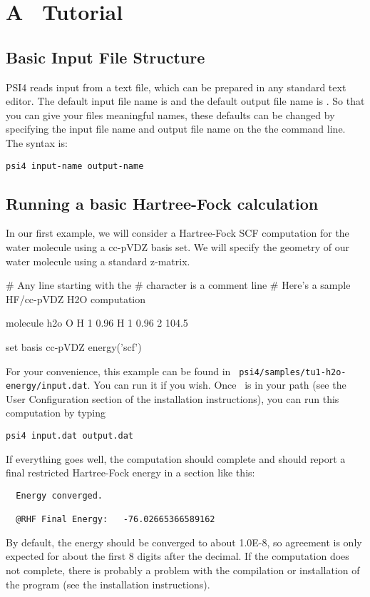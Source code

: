 \section{A \PSIfour\ Tutorial} \label{tutorial}

\subsection{Basic Input File Structure} 

PSI4 reads input from a text file, which can be prepared in any standard
text editor.  The default input file name is  and the
default output file name is .  So that you can give your
files meaningful names, these defaults can be changed by specifying
the input file name and output file name on the the command line.
The syntax is:

{\tt psi4 input-name output-name}

\subsection{Running a basic Hartree-Fock calculation}
In our first example, we will consider a Hartree-Fock SCF computation
for the water molecule using a cc-pVDZ basis set.  We will specify the
geometry of our water molecule using a standard z-matrix.

\begin{Snippet}

# Any line starting with the # character is a comment line
# Here's a sample HF/cc-pVDZ H2O computation

molecule h2o {
  O 
  H 1 0.96
  H 1 0.96 2 104.5
}

set basis cc-pVDZ
energy('scf')
\end{Snippet}

For your convenience, this example can be found in {\tt
psi4/samples/tu1-h2o-energy/input.dat}.  You can run it if you wish.
Once \PSIfour\ is in your path (see the User Configuration section of the
installation instructions), you can run this computation by typing
\begin{verbatim}
psi4 input.dat output.dat
\end{verbatim}
If everything goes well, the computation should complete and should report
a final restricted Hartree-Fock energy in a section like this:
\begin{verbatim}
  Energy converged.

  @RHF Final Energy:   -76.02665366589162
\end{verbatim}
By default, the energy should be converged to about 1.0E-8, so agreement
is only expected for about the first 8 digits after the decimal.  If the
computation does not complete, there is probably a problem with the
compilation or installation of the program (see the installation
instructions).

